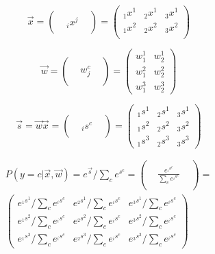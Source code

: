 \documentclass[12pt,a4paper]{article}%
\theoremstyle{definition}
\theoremstyle{plain}
\numberwithin{equation}{section}
\begin{document}
\begin{equation}
\vec{x} = \begin{pmatrix}
  &   &  \\
  &  {}_ix^{j} &  \\
 &   &
\end{pmatrix}   = \begin{pmatrix}
{}_1x^{1} & {}_2x^{1}    & {}_3x^{1}  \\
{}_1x^{2} & {}_2x^{2} & {}_3x^{2}  \\
\end{pmatrix}
\end{equation} 

\begin{equation}
\vec{w} = \begin{pmatrix}
  &   &  \\
  &  w_{j}^{c} &  \\
 &   &
\end{pmatrix} = \begin{pmatrix}
w_{1}^{1} & w_{2}^{1}     \\
w_{1}^{2} & w_{2}^{2}   \\
w_{1}^{3} & w_{2}^{3}   
\end{pmatrix}
\end{equation} 

\begin{equation}
\vec{s} = \vec{w} \vec{x} = \begin{pmatrix}
  &   &  \\
  &  {}_is^{c} &  \\
 &   & 
\end{pmatrix} = \begin{pmatrix}
{}_1s^{1}  &  {}_2s^{1}    &  {}_3s^{1}  \\
{}_1s^{2}  &  {}_2s^{2}  &  {}_3s^{2} \\
{}_1s^{3} & {}_2s^{3}     & {}_3s^{3}
\end{pmatrix} 
\end{equation} 

\begin{gather}
P( y = c |  \vec{x}, \vec{w})  = e^{\vec{s}} / \sum\limits_{c} e^{s^{c}}  = \begin{pmatrix}
  &   &  \\
  &  \frac{e^{{}_is^{c}}}{\sum\limits_{c} e^{{}_is^{c}}}  &  \\
 &   &
\end{pmatrix} = \\ \begin{pmatrix}
e^{{}_1s^{1}} /\sum\limits_{c} e^{{}_is^{c}} &  e^{{}_2s^{1}}  /\sum\limits_{c} e^{{}_is^{c}}    &  e^{{}_3s^{1}}  /\sum\limits_{c} e^{{}_is^{c}} \\
e^{{}_1s^{2}} /\sum\limits_{c} e^{{}_is^{c}} & e^{{}_2s^{2}} /\sum\limits_{c} e^{{}_is^{c}}    & e^{{}_3s^{2}} /\sum\limits_{c} e^{{}_is^{c}} \\
e^{{}_1s^{3}} /\sum\limits_{c} e^{{}_is^{c}} & e^{{}_2s^{3}}   /\sum\limits_{c} e^{{}_is^{c}}   & e^{{}_3s^{3}}   /\sum\limits_{c} e^{{}_is^{c}} 
\end{pmatrix} 
\end{gather} 
\end{document}
